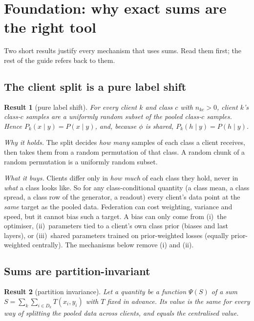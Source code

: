 \documentclass[11pt]{article}
\theoremstyle{plain}
\newtheorem{result}{Result}
\theoremstyle{definition}
\begin{document}
\section{Foundation: why exact sums are the right tool}\label{sec:foundation}

Two short results justify every mechanism that uses sums. Read them first; the rest of the guide refers back to them.

\subsection{The client split is a pure label shift}

\begin{result}[pure label shift]\label{res:labelshift}
For every client $k$ and class $c$ with $n_{kc}>0$, client $k$'s class-$c$ samples are a uniformly random subset of
the pooled class-$c$ samples. Hence $P_k(x\mid y)=P(x\mid y)$, and, because $\phi$ is shared, $P_k(h\mid y)=P(h\mid y)$.
\end{result}

\emph{Why it holds.} The split decides \emph{how many} samples of each class a client receives, then takes them from
a random permutation of that class. A random chunk of a random permutation is a uniformly random subset.

\emph{What it buys.} Clients differ only in \emph{how much} of each class they hold, never in \emph{what} a class
looks like. So for any class-conditional quantity (a class mean, a class spread, a class row of the generator, a
readout) every client's data point at the \emph{same} target as the pooled data. Federation can cost weighting,
variance and speed, but it cannot bias such a target. A bias can only come from (i)~the optimiser, (ii)~parameters
tied to a client's own class prior (biases and last layers), or (iii)~shared parameters trained on prior-weighted
losses (equally prior-weighted centrally). The mechanisms below remove (i) and (ii).

\subsection{Sums are partition-invariant}

\begin{result}[partition invariance]\label{res:invariance}
Let a quantity be a function $\Psi(S)$ of a sum $S=\sum_{k}\sum_{i\in D_k}T(x_i,y_i)$ with $T$ fixed in advance. Its
value is the same for every way of splitting the pooled data across clients, and equals the centralised value.
\end{result}
\end{document}
